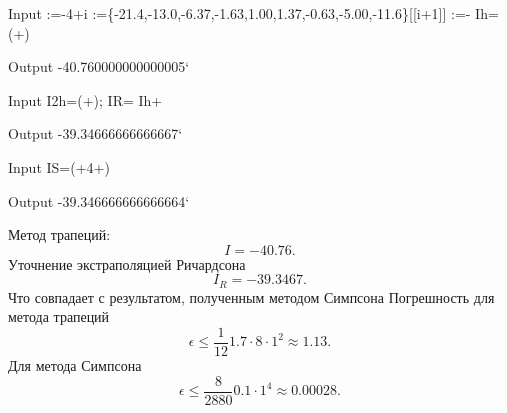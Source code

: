 \documentclass[a4paper]{article}
\title{}
\begin{document}
	\maketitle
\begin{mmaCell}[addtoindex=9,morepattern={i_, i, k_},moredefined={f, Ih},morefunctionlocal={k}]{Input}
  :=-4+i
  :=\{-21.4,-13.0,-6.37,-1.63,1.00,1.37,-0.63,-5.00,-11.6\}[[i+1]]
  :=-
  Ih=(+)
\end{mmaCell}
\begin{mmaCell}[addtoindex=3]{Output}
  -40.760000000000005`
\end{mmaCell}
\begin{mmaCell}[moredefined={I2h, f, IR, Ih},morefunctionlocal={k}]{Input}
  I2h=(+);
  IR= Ih+
\end{mmaCell}
\begin{mmaCell}[addtoindex=1]{Output}
  -39.34666666666667`
\end{mmaCell}
\begin{mmaCell}[moredefined={IS, f},morefunctionlocal={k}]{Input}
  IS=(+4+)
\end{mmaCell}
\begin{mmaCell}{Output}
  -39.346666666666664`
\end{mmaCell}
Метод трапеций:
\[
I=-40.76
.\]
Уточнение экстраполяцией Ричардсона
\[
I_R=-39.3467
.\] 
Что совпадает с результатом, полученным методом Симпсона
Погрешность для метода трапеций
\[
\epsilon\le  \frac{1}{12} 1.7 \cdot 8 \cdot 1^2 \approx 1.13
.\] 
Для метода Симпсона
\[
\epsilon \le  \frac{8}{2880} 0.1 \cdot 1^4\approx 0.00028
.\] 
\end{document}
